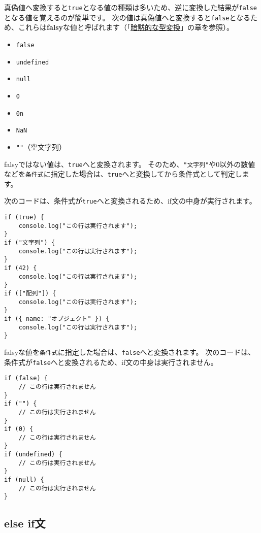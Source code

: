 真偽値へ変換すると\texttt{true}となる値の種類は多いため、逆に変換した結果が\texttt{false}となる値を覚えるのが簡単です。
次の値は真偽値へと変換すると\texttt{false}となるため、これらは\textbf{falsy}な値と呼ばれます（「\hyperlink{implicit-coercion}{暗黙的な型変換}」の章を参照）。

\begin{itemize}
\item
  \texttt{false}
\item
  \texttt{undefined}
\item
  \texttt{null}
\item
  \texttt{0}
\item
  \texttt{0n}
\item
  \texttt{NaN}
\item
  \texttt{""}（空文字列）
\end{itemize}

falsyではない値は、\texttt{true}へと変換されます。
そのため、\texttt{"文字列"}や0以外の数値などを\texttt{条件式}に指定した場合は、\texttt{true}へと変換してから条件式として判定します。

次のコードは、条件式が\texttt{true}へと変換されるため、if文の中身が実行されます。

\begin{lstlisting}
if (true) {
    console.log("この行は実行されます");
}
if ("文字列") {
    console.log("この行は実行されます");
}
if (42) {
    console.log("この行は実行されます");
}
if (["配列"]) {
    console.log("この行は実行されます");
}
if ({ name: "オブジェクト" }) {
    console.log("この行は実行されます");
}
\end{lstlisting}

falsyな値を\texttt{条件式}に指定した場合は、\texttt{false}へと変換されます。
次のコードは、条件式が\texttt{false}へと変換されるため、if文の中身は実行されません。

\enlargethispage{\baselineskip}\begin{lstlisting}
if (false) {
    // この行は実行されません
}
if ("") {
    // この行は実行されません
}
if (0) {
    // この行は実行されません
}
if (undefined) {
    // この行は実行されません
}
if (null) {
    // この行は実行されません
}
\end{lstlisting}

\hypertarget{else-if-statement}{%
\subsection{else if文}\label{else-if-statement}}


